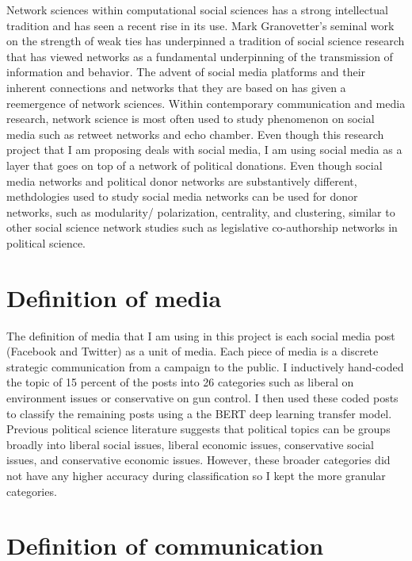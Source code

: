 \documentclass[12pt,]{article}
\begin{document}
Network sciences within computational social sciences has a strong
intellectual tradition and has seen a recent rise in its use. Mark
Granovetter's seminal work on the strength of weak ties has underpinned
a tradition of social science research that has viewed networks as a
fundamental underpinning of the transmission of information and
behavior. The advent of social media platforms and their inherent
connections and networks that they are based on has given a reemergence
of network sciences. Within contemporary communication and media
research, network science is most often used to study phenomenon on
social media such as retweet networks and echo chamber. Even though this
research project that I am proposing deals with social media, I am using
social media as a layer that goes on top of a network of political
donations. Even though social media networks and political donor
networks are substantively different, methdologies used to study social
media networks can be used for donor networks, such as modularity/
polarization, centrality, and clustering, similar to other social
science network studies such as legislative co-authorship networks in
political science.

\hypertarget{definition-of-media}{%
\section{Definition of media}\label{definition-of-media}}

The definition of media that I am using in this project is each social
media post (Facebook and Twitter) as a unit of media. Each piece of
media is a discrete strategic communication from a campaign to the
public. I inductively hand-coded the topic of 15 percent of the posts
into 26 categories such as liberal on environment issues or conservative
on gun control. I then used these coded posts to classify the remaining
posts using a the BERT deep learning transfer model. Previous political
science literature suggests that political topics can be groups broadly
into liberal social issues, liberal economic issues, conservative social
issues, and conservative economic issues. However, these broader
categories did not have any higher accuracy during classification so I
kept the more granular categories.

\hypertarget{definition-of-communication}{%
\section{Definition of
communication}\label{definition-of-communication}}
\end{document}
